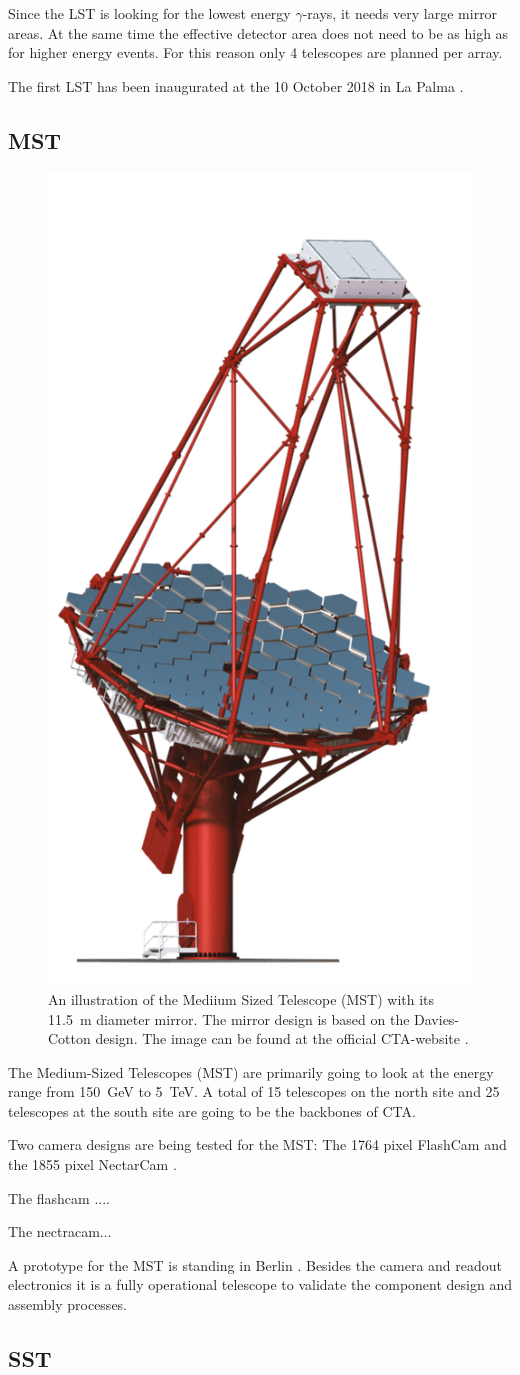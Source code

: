 Since the LST is looking for the lowest energy $\gamma$-rays, it needs
very large mirror areas. At the same time the effective detector area does 
not need to be as high as for higher energy events.
For this reason only 4 telescopes are planned per array.

The first LST has been inaugurated at the 10 October 2018 in La Palma \cite{lst_debut}.


\newpage
\subsection{MST}

\begin{figure}
	\centering
	\captionsetup{width=0.9\linewidth}
	\includegraphics[width=.2\textwidth]{images/MST-1.png}
	\caption{An illustration of the Mediium Sized Telescope (MST) with its
	\SI{11.5}{\meter} diameter mirror.
	The mirror design is based on the Davies-Cotton design.
	The image can be found at the official CTA-website \cite{cta_web}.}
	\label{fig:mst}
\end{figure}

The Medium-Sized Telescopes (MST) are primarily going to look at the 
energy range from \SI{150}{\giga\electronvolt} to \SI{5}{\tera\electronvolt}.
A total of 15 telescopes on the north site and 25 telescopes at the south site 
are going to be the backbones of CTA.

Two camera designs are being tested for the MST:
The 1764 pixel FlashCam and the 1855 pixel NectarCam \cite{cta_web}.

The flashcam ....

The nectracam...

A prototype for the MST is standing in Berlin .
Besides the camera and readout electronics it is a fully operational telescope
to validate the component design and assembly processes.


\newpage
\subsection{SST}

